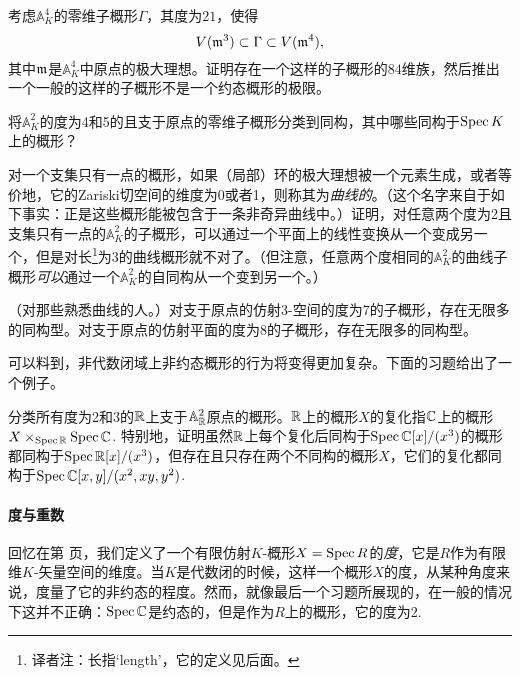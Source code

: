 \begin{exe}
	考虑$\mathbb{A}_K^4$的零维子概形$\Gamma$，其度为$21$，使得
	\[
	V(\mathfrak{m}^3)\subset \Gamma \subset V(\mathfrak{m}^4),
	\]
	其中$\mathfrak{m}$是$\mathbb{A}_K^4$中原点的极大理想。证明存在一个这样的子概形的$84$维族，然后推出一个一般的这样的子概形不是一个约态概形的极限。
\end{exe}

\begin{exe}
	将$\mathbb{A}_K^2$的度为4和5的且支于原点的零维子概形分类到同构，其中哪些同构于$\operatorname{Spec} K$上的概形？
\end{exe}

\begin{exe}
	对一个支集只有一点的概形，如果（局部）环的极大理想被一个元素生成，或者等价地，它的Zariski切空间的维度为0或者1，则称其为\textit{曲线的}。（这个名字来自于如下事实：正是这些概形能被包含于一条非奇异曲线中。）证明，对任意两个度为2且支集只有一点的$\mathbb{A}_K^2$的子概形，可以通过一个平面上的线性变换从一个变成另一个，但是对长\footnote{译者注：长指`length'，它的定义见后面。}为3的曲线概形就不对了。（但注意，任意两个度相同的$\mathbb{A}_K^2$的曲线子概形\textit{可以}通过一个$\mathbb{A}_K^2$的自同构从一个变到另一个。）
\end{exe}

\begin{exe}
	（对那些熟悉曲线的人。）对支于原点的仿射$3$\hyp 空间的度为7的子概形，存在无限多的同构型。对支于原点的仿射平面的度为8的子概形，存在无限多的同构型。
\end{exe}

可以料到，非代数闭域上非约态概形的行为将变得更加复杂。下面的习题给出了一个例子。

\begin{exe}
	分类所有度为2和3的$\mathbb{R}$上支于$\mathbb{A}_{\mathbb{R}}^2$原点的概形。$\mathbb{R}$上的概形$X$的复化指$\mathbb{C}$上的概形$X\times_{\operatorname{Spec} \mathbb{R}}\operatorname{Spec} \mathbb{C}$. 特别地，证明虽然$\mathbb{R}$上每个复化后同构于$\operatorname{Spec} \mathbb{C}[x]/(x^3)$的概形都同构于$\operatorname{Spec} \mathbb{R}[x]/(x^3)$，但存在且只存在两个不同构的概形$X$，它们的复化都同构于$\operatorname{Spec} \mathbb{C}[x,y]/(x^2,xy,y^2)$.
\end{exe}

\paragraph*{度与重数}
回忆在第 \pageref{deg} 页，我们定义了一个有限仿射$K$\hyp 概形$X=\operatorname{Spec} R$的\textit{度}，它是$R$作为有限维$K$\hyp 矢量空间的维度。当$K$是代数闭的时候，这样一个概形$X$的度，从某种角度来说，度量了它的非约态的程度。然而，就像最后一个习题所展现的，在一般的情况下这并不正确：$\operatorname{Spec} \mathbb{C}$是约态的，但是作为$R$上的概形，它的度为2.

